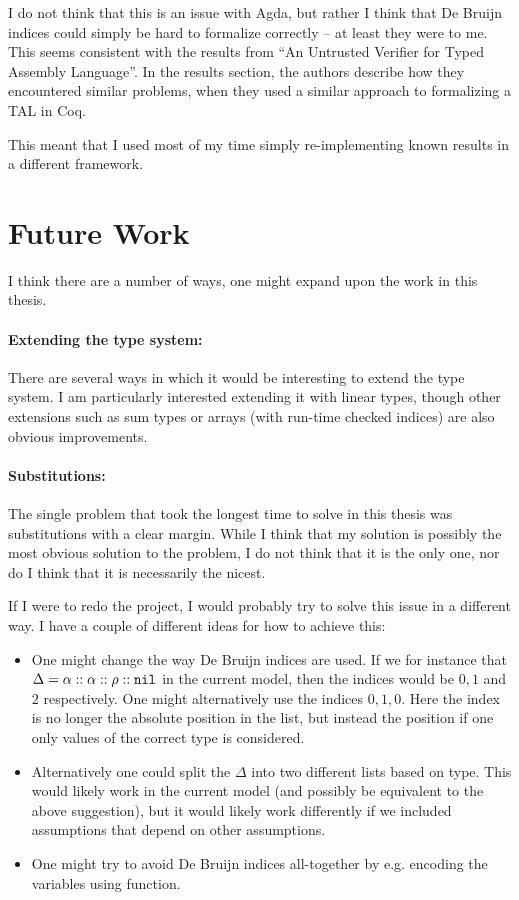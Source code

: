I do not think that this is an issue with Agda, but rather I think that De
Bruijn indices could simply be hard to formalize correctly -- at least they were
to me. This seems consistent with the results from ``An Untrusted Verifier for
Typed Assembly Language''\cite{untrusted}. In the results section, the authors
describe how they encountered similar problems, when they used a similar
approach to formalizing a TAL in Coq.

This meant that I used most of my time simply re-implementing known results in a
different framework.

\section{Future Work}

I think there are a number of ways, one might expand upon the work in this
thesis.

\paragraph{Extending the type system:}
There are several ways in which it would be interesting to extend the type
system. I am particularly interested extending it with linear types, though
other extensions such as sum types or arrays (with run-time checked indices) are
also obvious improvements.

\paragraph{Substitutions:}
The single problem that took the longest time to solve in this thesis was
substitutions with a clear margin. While I think that my solution is possibly
the most obvious solution to the problem, I do not think that it is the only
one, nor do I think that it is necessarily the nicest.

If I were to redo the project, I would probably try to solve this issue in a
different way. I have a couple of different ideas for how to achieve this:

\begin{itemize}
\item One might change the way De Bruijn indices are used. If we for instance
  that $\Delta = \alpha :: \alpha :: \rho :: \mathtt{nil}$ in the current model, then
  the indices would be $0, 1$ and $2$ respectively. One might alternatively use
  the indices $0, 1, 0$. Here the index is no longer the absolute position in
  the list, but instead the position if one only values of the correct type is
  considered.
\item Alternatively one could split the $\Delta$ into two different lists based
  on type. This would likely work in the current model (and possibly be
  equivalent to the above suggestion), but it would likely work differently if
  we included assumptions that depend on other assumptions.
\item One might try to avoid De Bruijn indices all-together by e.g. encoding the
  variables using function.
\end{itemize}

